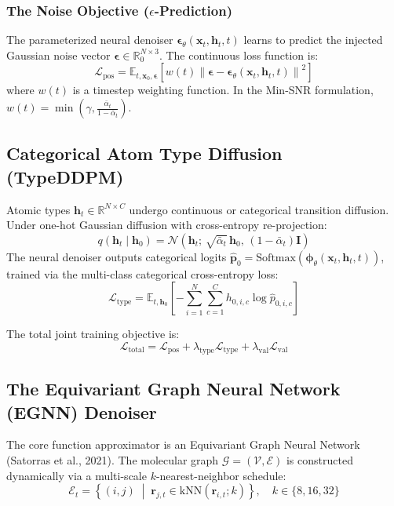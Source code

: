 \documentclass[11pt, a4paper]{article}
\begin{document}
\subsubsection{\texorpdfstring{The Noise Objective ($\epsilon$-Prediction)}{The Noise Objective (epsilon-Prediction)}}
The parameterized neural denoiser $\bm{\epsilon}_\theta(\bm{x}_t, \bm{h}_t, t)$ learns to predict the injected Gaussian noise vector $\bm{\epsilon} \in \mathbb{R}_0^{N \times 3}$. The continuous loss function is:
\begin{equation}
\mathcal{L}_{\text{pos}} = \mathbb{E}_{t, \bm{x}_0, \bm{\epsilon}}\left[ w(t) \left\| \bm{\epsilon} - \bm{\epsilon}_\theta(\bm{x}_t, \bm{h}_t, t) \right\|^2 \right]
\end{equation}
where $w(t)$ is a timestep weighting function. In the Min-SNR formulation, $w(t) = \min\left( \gamma, \frac{\bar{\alpha}_t}{1 - \bar{\alpha}_t} \right)$.

\subsection{Categorical Atom Type Diffusion (TypeDDPM)}
Atomic types $\bm{h}_t \in \mathbb{R}^{N \times C}$ undergo continuous or categorical transition diffusion. Under one-hot Gaussian diffusion with cross-entropy re-projection:
\begin{equation}
q(\bm{h}_t \mid \bm{h}_0) = \mathcal{N}\left(\bm{h}_t;\, \sqrt{\bar{\alpha}_t}\,\bm{h}_0,\, (1 - \bar{\alpha}_t)\bm{I}\right)
\end{equation}
The neural denoiser outputs categorical logits $\hat{\bm{p}}_0 = \text{Softmax}(\bm{\phi}_\theta(\bm{x}_t, \bm{h}_t, t))$, trained via the multi-class categorical cross-entropy loss:
\begin{equation}
\mathcal{L}_{\text{type}} = \mathbb{E}_{t, \bm{h}_0}\left[ -\sum_{i=1}^N \sum_{c=1}^C h_{0, i, c} \log \hat{p}_{0, i, c} \right]
\end{equation}

The total joint training objective is:
\begin{equation}
\mathcal{L}_{\text{total}} = \mathcal{L}_{\text{pos}} + \lambda_{\text{type}} \mathcal{L}_{\text{type}} + \lambda_{\text{val}} \mathcal{L}_{\text{val}}
\end{equation}

\subsection{The Equivariant Graph Neural Network (EGNN) Denoiser}
The core function approximator is an Equivariant Graph Neural Network (Satorras et al., 2021). The molecular graph $\mathcal{G} = (\mathcal{V}, \mathcal{E})$ is constructed dynamically via a multi-scale $k$-nearest-neighbor schedule:
\begin{equation}
\mathcal{E}_t = \left\{ (i, j) \;\middle|\; \bm{r}_{j, t} \in \text{kNN}(\bm{r}_{i, t}; k) \right\}, \quad k \in \{8, 16, 32\}
\end{equation}
\end{document}
